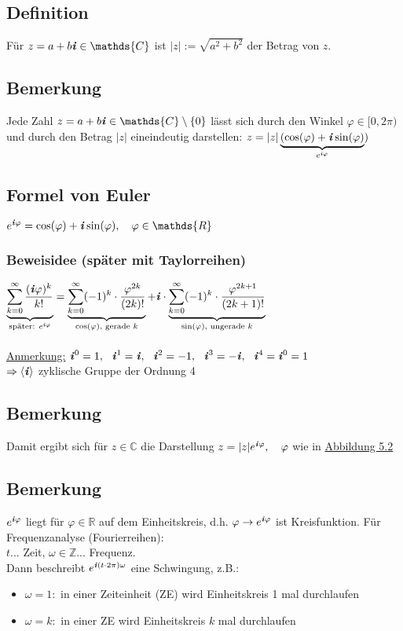 \documentclass[12pt,titlepage, pdf]{article}
\newcommand{\R}{\mathds{R}}
\newcommand{\Z}{\mathds{Z}}
\newcommand{\C}{\mathds{C}}
\newcommand{\uline}[1]{\underline{#1}}
\renewcommand{\i}{\textbf{\textit{i}}}
\renewcommand{\>}{\rightarrow}
\renewcommand{\*}{\cdot}
\renewcommand{\phi}{\varphi}
\begin{document}
		      		\subsection{Definition}
		      		Für $z = a+b\i \in \C$ ist $|z| := \sqrt{a^2 + b^2}$ der Betrag von $z$.
		      		\subsection{Bemerkung}
		      		Jede Zahl $z = a+b\i \in \C \setminus \{0\} $ lässt sich durch den Winkel $\phi \in [0,2\pi)$ und durch den Betrag $|z|$ eineindeutig darstellen: 
		      			$z = |z|\underbrace{(\cos(\phi) + \i \sin(\phi)}_{e^{\i\phi}})$
		      			\subsection{Formel von Euler}
		      			\label{5.5}
		      			$e^{\i\phi} = \cos(\phi) + \i \sin(\phi),~~~ \phi \in \R$
		      			\subsubsection*{Beweisidee (später mit Taylorreihen)}
		      			$\underbrace{\sum_{k = 0}^{\infty} \frac{(\i\phi)^k}{k!}}_{\text{später: }e^{\i\phi}} = \underbrace{\sum_{k = 0}^{\infty}(-1)^k \cdot \frac{\phi^{2k}}{(2k)!}}_{\cos(\phi)\textrm{, gerade }k} + \i \cdot \underbrace{ \sum_{k = 0}^{\infty}(-1)^k \cdot \frac{\phi^{2k+1}}{(2k+1)!}}_{\sin(\phi)\textrm{, ungerade }k}$\\
		      			\\
		      			\uline{Anmerkung:} $\i^0 = 1,~~ \i^1 = \i,~~ \i^2 = -1,~~ \i^3 = -\i,~~ \i^4 = \i^0 = 1$\\
		      			$\Rightarrow \langle \i \rangle$ zyklische Gruppe der Ordnung 4
		      			\subsection{Bemerkung}
		      			Damit ergibt sich für $z \in \C$ die Darstellung $z = |z| e^{\i\phi},~~~ \phi$ wie in \hyperref[5.2]{Abbildung 5.2}
		      			\subsection{Bemerkung}
		      			$e^{\i\phi}$ liegt für $\phi \in \R$ auf dem Einheitskreis, d.h. $\phi \rightarrow e^{\i\phi}$ ist Kreisfunktion. Für Frequenzanalyse (Fourierreihen): \\
		      			$t$... Zeit, $\omega \in \Z$... Frequenz. \\
		      			Dann beschreibt $e^{\i(t \cdot 2\pi) \omega}$ eine Schwingung, z.B.:
		      			\begin{itemize}
		      				\item $\omega = 1:$ in einer Zeiteinheit (ZE) wird Einheitskreis 1 mal durchlaufen
		      				\item $\omega = k:$ in einer ZE wird Einheitskreis $k$ mal durchlaufen
		      			\end{itemize}
\end{document}

